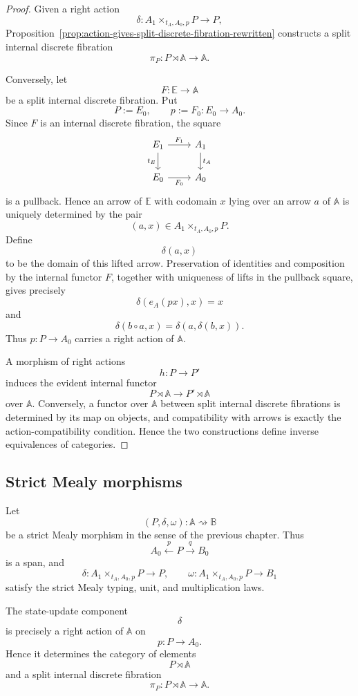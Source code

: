 \begin{proof}
Given a right action
\[
\delta:A_1\times_{t_A,A_0,p}P\to P,
\]
Proposition~\ref{prop:action-gives-split-discrete-fibration-rewritten}
constructs a split internal discrete fibration
\[
\pi_P:P\rtimes\mathbb A\to\mathbb A.
\]

Conversely, let
\[
F:\mathbb E\to\mathbb A
\]
be a split internal discrete fibration. Put
\[
P:=E_0,
\qquad
p:=F_0:E_0\to A_0.
\]
Since \(F\) is an internal discrete fibration, the square
\[
\begin{tikzcd}
E_1 \arrow[r, "F_1"] \arrow[d, "t_E"'] &
A_1 \arrow[d, "t_A"]
\\
E_0 \arrow[r, "F_0"'] &
A_0
\end{tikzcd}
\]
is a pullback. Hence an arrow of \(\mathbb E\) with codomain \(x\) lying
over an arrow \(a\) of \(\mathbb A\) is uniquely determined by the pair
\[
(a,x)\in A_1\times_{t_A,A_0,p}P.
\]
Define
\[
\delta(a,x)
\]
to be the domain of this lifted arrow. Preservation of identities and
composition by the internal functor \(F\), together with uniqueness of
lifts in the pullback square, gives precisely
\[
\delta(e_A(px),x)=x
\]
and
\[
\delta(b\circ a,x)=\delta(a,\delta(b,x)).
\]
Thus \(p:P\to A_0\) carries a right action of \(\mathbb A\).

A morphism of right actions
\[
h:P\to P'
\]
induces the evident internal functor
\[
P\rtimes\mathbb A\to P'\rtimes\mathbb A
\]
over \(\mathbb A\). Conversely, a functor over \(\mathbb A\) between
split internal discrete fibrations is determined by its map on objects,
and compatibility with arrows is exactly the action-compatibility
condition. Hence the two constructions define inverse equivalences of
categories.
\end{proof}

\subsection{Strict Mealy morphisms}
\label{subsec:strict-mealy-derived-rewritten}

Let
\[
(P,\delta,\omega):\mathbb A\rightsquigarrow\mathbb B
\]
be a strict Mealy morphism in the sense of the previous chapter. Thus
\[
A_0\xleftarrow{p}P\xrightarrow{q}B_0
\]
is a span, and
\[
\delta:
A_1\times_{t_A,A_0,p}P\to P,
\qquad
\omega:
A_1\times_{t_A,A_0,p}P\to B_1
\]
satisfy the strict Mealy typing, unit, and multiplication laws.

The state-update component
\[
\delta
\]
is precisely a right action of \(\mathbb A\) on
\[
p:P\to A_0.
\]
Hence it determines the category of elements
\[
P\rtimes\mathbb A
\]
and a split internal discrete fibration
\[
\pi_P:P\rtimes\mathbb A\to\mathbb A.
\]


